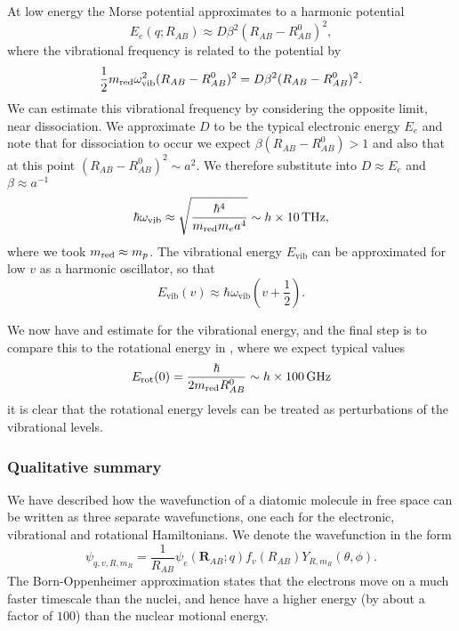 At low energy the Morse potential approximates
to a harmonic potential
%
\begin{equation}
  E_e(q; R_{AB}) \approx D\beta^2(R_{AB} - R_{AB}^0)^2,
\end{equation}
%
where the vibrational frequency is related to the potential by
%
\begin{equation}
  \frac{1}{2}m_\text{red}{}\omega_\text{vib}^2(R_{AB}-R_{AB}^0)^2 = D\beta^2(R_{AB}-R_{AB}^0)^2.
  \label{theory:eqn:vibfreqrel}
\end{equation}  
%
We can estimate this vibrational frequency by considering the opposite limit,
near dissociation. We approximate $D$ to be the typical electronic energy $E_e$
and note that for dissociation to occur we expect $\beta(R_{AB} - R_{AB}^0) >
1$ and also that at this point $(R_{AB} - R_{AB}^0)^2\sim a^2$. We therefore
substitute into  $D\approx E_e$ and
$\beta\approx a^{-1}$
%
\begin{equation}
  \hbar\omega_\text{vib} \approx \sqrt{\frac{\hbar^4}{\mred{} m_e a^4}} \sim
    h\times\SI{10}{\tera\hertz},
\end{equation}
%
where we took $m_\text{red}{}\approx m_p$. The vibrational energy $E_\text{vib}$ can
be approximated for low $v$ as a harmonic oscillator, so that
%
\begin{equation}
  E_\text{vib}(v)\approx \hbar\omega_\text{vib}\left(v+\frac{1}{2}\right).
\end{equation}

We now have and estimate for the vibrational energy, and the final step is to
compare this to the rotational energy in , where
we expect typical values
%
\begin{equation}
  E_\text{rot}(0) = \frac{\hbar}{2 m_\text{red}{} R^0_{AB}} \sim h\times\SI{100}{\giga\hertz}
\end{equation}
%
it is clear that the rotational energy levels can be treated as perturbations
of the vibrational levels.

\subsubsection{Qualitative summary}

We have described how the wavefunction of a diatomic molecule in free space can
be written as three separate wavefunctions, one each for the electronic,
vibrational and rotational Hamiltonians. We denote the wavefunction in the form
%
\begin{equation}
  \psi_{q, v, R, m_R} = \frac{1}{R_{AB}}\psi_e(\mathbf{R}_{AB};q)
  f_v(R_{AB})Y_{R, m_R}(\theta, \phi).
\end{equation}
%
The Born-Oppenheimer approximation states that the electrons move on a much
faster timescale than the nuclei, and hence have a higher energy (by about a
factor of $100$) than the nuclear motional energy.


